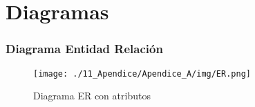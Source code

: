 \chapter[Diagramas]{
  \label{chp:diagramas}
  Diagramas
}
\thispagestyle{numberingStyle}
\pagestyle{numberingStyle}


\subsection{Diagrama Entidad Relación}
\begin{sidewaysfigure}[ht]
\texttt{[image: ./11\_Apendice/Apendice\_A/img/ER.png]}
\caption{Diagrama ER con atributos}
\end{sidewaysfigure}